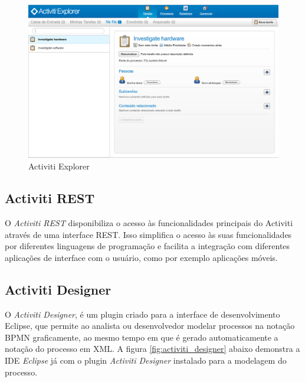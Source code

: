 \begin{figure}[H]
\centering
\includegraphics[width=1\textwidth]{imagens/activiti_explorer.png}
\caption{Activiti Explorer}
\label{fig:activiti_explorer}
\end{figure}

\subsection{Activiti REST}\label{sec:automatizacao_processos-gestao_processos_activiti_rest}

O \textit{Activiti REST} disponibiliza o acesso às funcionalidades principais do Activiti através de uma interface REST. Isso simplifica o acesso às suas funcionalidades por diferentes linguagens de programação e facilita a integração com diferentes aplicações de interface com o usuário, como por exemplo aplicações móveis.

\subsection{Activiti Designer}\label{sec:automatizacao_processos-gestao_processos_activiti_designer}

O \textit{Activiti Designer}, é um plugin criado para a interface de desenvolvimento Eclipse, que permite ao analista ou desenvolvedor modelar processos na notação BPMN graficamente, ao mesmo tempo em que é gerado automaticamente a notação do processo em XML. A figura \ref{fig:activiti_designer} abaixo demonstra a IDE\cite{ide} \textit{Eclipse} já com o plugin \textit{Activiti Designer} instalado para a modelagem do processo.

